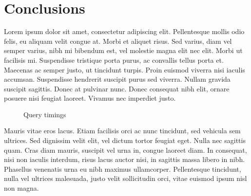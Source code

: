 

\section{Conclusions}

Lorem ipsum dolor sit amet, consectetur adipiscing elit. Pellentesque mollis odio felis, eu aliquam velit congue at. Morbi et aliquet risus. Sed varius, diam vel semper varius, nibh mi bibendum est, vel molestie magna elit nec elit. Morbi ut facilisis mi. Suspendisse tristique porta purus, ac convallis tellus porta et. Maecenas ac semper justo, ut tincidunt turpis. Proin euismod viverra nisi iaculis accumsan. Suspendisse hendrerit suscipit purus sed viverra. Nullam gravida suscipit sagittis. Donec at pulvinar nunc. Donec consequat nibh elit, ornare posuere nisi feugiat laoreet. Vivamus nec imperdiet justo.

\begin{figure}[h]
\centering
{}
  \caption{Query timings}
  \label{fig:graph}
\end{figure}

Mauris vitae eros lacus. Etiam facilisis orci ac nunc tincidunt, sed vehicula sem ultrices. Sed dignissim velit elit, vel dictum tortor feugiat eget. Nulla nec sagittis quam. Cras diam mauris, suscipit vel urna in, congue laoreet diam. In consequat, nisi non iaculis interdum, risus lacus auctor nisi, in sagittis massa libero in nibh. Phasellus venenatis urna eu nibh maximus ullamcorper. Pellentesque tincidunt, nulla vel ultrices malesuada, justo velit sollicitudin orci, vitae euismod ipsum nisl non magna.